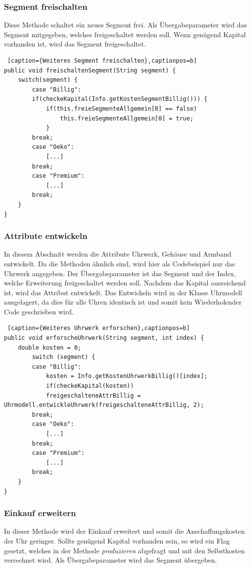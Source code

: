 \subsubsection{Segment freischalten}
Diese Methode schaltet ein neues Segment frei. Als Übergabeparameter wird das Segment mitgegeben, welches freigeschaltet werden soll. Wenn genügend Kapital vorhanden ist, wird das Segment freigeschaltet.

\lstset{language=Java} 
\begin{lstlisting} [caption={Weiteres Segment freischalten},captionpos=b]
public void freischaltenSegment(String segment) {
	switch(segment) {
		case "Billig":
		if(checkeKapital(Info.getKostenSegmentBillig())) {
			if(this.freieSegmenteAllgemein[0] == false)
				this.freieSegmenteAllgemein[0] = true;
			}
		break;
		case "Oeko":
			[...]
		break;
		case "Premium":
			[...]
		break;
	}
}
\end{lstlisting}

\subsubsection{Attribute entwickeln}
In diesem Abschnitt werden die Attribute Uhrwerk, Gehäuse und Armband entwickelt. Da die Methoden ähnlich sind, wird hier als Codebeispiel nur das Uhrwerk angegeben. Der Übergabeparameter ist das Segment und der Index, welche Erweiterung freigeschaltet werden soll. Nachdem das Kapital ausreichend ist, wird das Attribut entwickelt. Das Entwickeln wird in der Klasse Uhrmodell ausgelagert, da dies für alle Uhren identisch ist und somit kein Wiederholender Code geschrieben wird.

\lstset{language=Java}
\begin{lstlisting} [caption={Weiteres Uhrwerk erforschen},captionpos=b]
public void erforscheUhrwerk(String segment, int index) {
	double kosten = 0;
		switch (segment) {
		case "Billig":
			kosten = Info.getKostenUhrwerkBillig()[index];
			if(checkeKapital(kosten))
			freigeschalteneAttrBillig = Uhrmodell.entwickleUhrwerk(freigeschalteneAttrBillig, 2);
		break;
		case "Oeko":
			[...]				
		break;
		case "Premium":
			[...]
		break;
	}	
}
\end{lstlisting}

\subsubsection{Einkauf erweitern}
In dieser Methode wird der Einkauf erweitert und somit die Anschaffungskosten der Uhr geringer. Sollte genügend Kapital vorhanden sein, so wird ein Flag gesetzt, welches in der Methode \textit{produzieren} abgefragt und mit den Selbstkosten verrechnet wird. Als Übergabeparameter wird das Segment übergeben.


